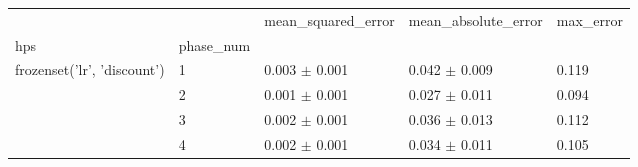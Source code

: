 \begin{tabular}{lllll}
\toprule
 &  & mean_squared_error & mean_absolute_error & max_error \\
hps & phase_num &  &  &  \\
\midrule
\multirow[t]{4}{*}{frozenset({'lr', 'discount'})} & 1 & 0.003 $\pm$ 0.001 & 0.042 $\pm$ 0.009 & 0.119 \\
 & 2 & 0.001 $\pm$ 0.001 & 0.027 $\pm$ 0.011 & 0.094 \\
 & 3 & 0.002 $\pm$ 0.001 & 0.036 $\pm$ 0.013 & 0.112 \\
 & 4 & 0.002 $\pm$ 0.001 & 0.034 $\pm$ 0.011 & 0.105 \\
\cline{1-5}
\bottomrule
\end{tabular}
